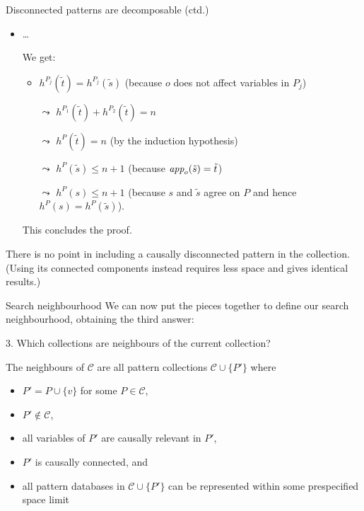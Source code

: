 \documentclass{gkibeamer}
\begin{document}
\begin{frame}{Disconnected patterns are decomposable (ctd.)}
  \begin{proofend}
    \begin{itemize}
    \item \dots

      We get:
      \begin{itemize}
      \item $h^{P_j}(\tilde{t}) = h^{P_j}(\tilde{s})$ (because
        $o$ does not affect variables in $P_j$)
      \item[$\leadsto$] $h^{P_1}(\tilde{t}) + h^{P_2}(\tilde{t}) = n$
      \item[$\leadsto$] $h^P(\tilde{t}) = n$ (by the induction
        hypothesis)
      \item[$\leadsto$] $h^P(\tilde{s}) \le n + 1$ (because
        $\textit{app}_{o}(\tilde{s}) = \tilde{t}$)
      \item[$\leadsto$] $h^P(s) \le n + 1$ (because
        $s$ and $\tilde{s}$ agree on $P$ and hence $h^P(s) =
        h^P(\tilde{s})$).
      \end{itemize}
      This concludes the proof.
    \end{itemize}
  \end{proofend}

   There is no point in including a causally
  disconnected pattern in the collection. (Using its connected
  components instead requires less space and gives identical results.)
\end{frame}

\begin{frame}{Search neighbourhood}
  We can now put the pieces together to define our search
  neighbourhood, obtaining the third answer:
  
  \begin{block}{3. Which collections are neighbours of the
      current collection?}
    
    The neighbours of $\mathcal C$ are all pattern collections
    $\mathcal C \cup \{P'\}$ where
    \begin{itemize}
    \item $P' = P \cup \{v\}$ for some $P \in \mathcal C$,
    \item $P' \notin \mathcal C$,
    \item all variables of $P'$ are causally relevant in $P'$,
    \item $P'$ is causally connected, and
    \item all pattern databases in $\mathcal C \cup \{P'\}$ can be
      represented within some prespecified space limit
    \end{itemize}
  \end{block}
\end{frame}
\end{document}
